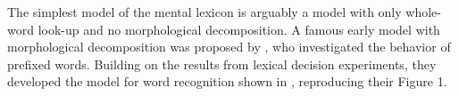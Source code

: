 The simplest model of the mental lexicon is arguably a model with only whole-word look-up and no morphological decomposition.
A famous early model with morphological decomposition was proposed by
\citet{TaftandForster:1975}, who investigated the behavior of prefixed
words. 
Building on the results from lexical decision experiments,
they developed the model for word
recognition shown in ,
reproducing their Figure 1.



